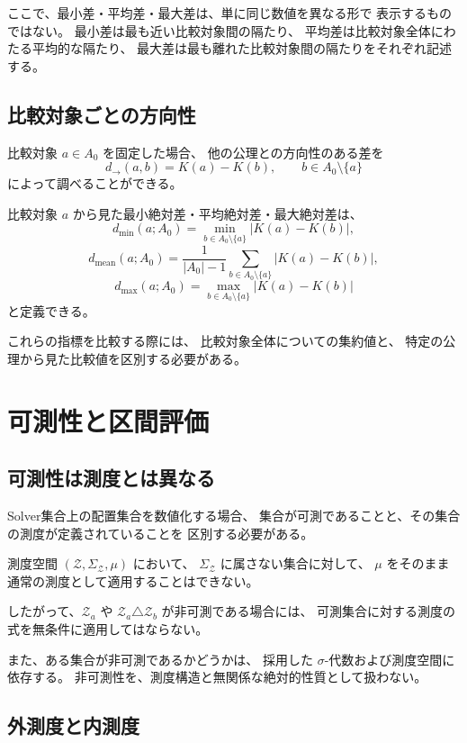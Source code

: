 \documentclass[a4paper,12pt]{article}
\begin{document}
ここで、最小差・平均差・最大差は、単に同じ数値を異なる形で
表示するものではない。
最小差は最も近い比較対象間の隔たり、
平均差は比較対象全体にわたる平均的な隔たり、
最大差は最も離れた比較対象間の隔たりをそれぞれ記述する。

\subsection{比較対象ごとの方向性}

比較対象 $a\in A_0$ を固定した場合、
他の公理との方向性のある差を
\[
    d_{\to}(a,b)=K(a)-K(b),
    \qquad b\in A_0\setminus\{a\}
\]
によって調べることができる。

比較対象 $a$ から見た最小絶対差・平均絶対差・最大絶対差は、
\[
    d_{\min}(a;A_0)
    =
    \min_{b\in A_0\setminus\{a\}}|K(a)-K(b)|,
\]
\[
    d_{\mathrm{mean}}(a;A_0)
    =
    \frac{1}{|A_0|-1}
    \sum_{b\in A_0\setminus\{a\}}|K(a)-K(b)|,
\]
\[
    d_{\max}(a;A_0)
    =
    \max_{b\in A_0\setminus\{a\}}|K(a)-K(b)|
\]
と定義できる。

これらの指標を比較する際には、
比較対象全体についての集約値と、
特定の公理から見た比較値を区別する必要がある。

\section{可測性と区間評価}

\subsection{可測性は測度とは異なる}

Solver集合上の配置集合を数値化する場合、
集合が可測であることと、その集合の測度が定義されていることを
区別する必要がある。

測度空間 $(\mathcal{Z},\Sigma_{\mathcal{Z}},\mu)$ において、
$\Sigma_{\mathcal{Z}}$ に属さない集合に対して、
$\mu$ をそのまま通常の測度として適用することはできない。

したがって、$\mathcal{Z}_a$ や
$\mathcal{Z}_a\triangle\mathcal{Z}_b$ が非可測である場合には、
可測集合に対する測度の式を無条件に適用してはならない。

また、ある集合が非可測であるかどうかは、
採用した $\sigma$-代数および測度空間に依存する。
非可測性を、測度構造と無関係な絶対的性質として扱わない。

\subsection{外測度と内測度}
\end{document}
